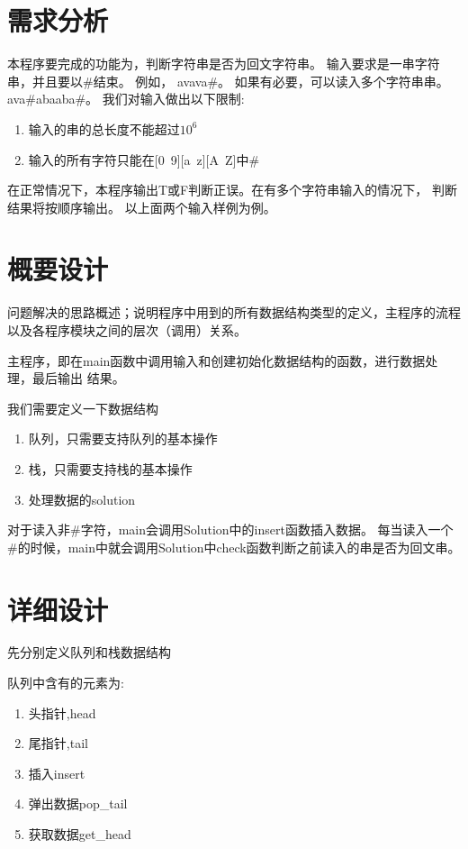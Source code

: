\section{需求分析}

本程序要完成的功能为，判断字符串是否为回文字符串。
输入要求是一串字符串，并且要以\#结束。
例如，
avava\#。
如果有必要，可以读入多个字符串串。
ava\#abaaba\#。
我们对输入做出以下限制:
\begin{enumerate}
   \item 输入的串的总长度不能超过$10^6$
   \item 输入的所有字符只能在[0~9][a~z][A~Z]中\#
\end{enumerate}


在正常情况下，本程序输出T或F判断正误。在有多个字符串输入的情况下，
判断结果将按顺序输出。
以上面两个输入样例为例。



\section{概要设计}
   问题解决的思路概述；说明程序中用到的所有数据结构类型的定义，主程序的流程以及各程序模块之间的层次（调用）关系。
   
   
   主程序，即在main函数中调用输入和创建初始化数据结构的函数，进行数据处理，最后输出
   结果。


   我们需要定义一下数据结构
   \begin{enumerate}
      \item 队列，只需要支持队列的基本操作
      \item 栈，只需要支持栈的基本操作
      \item 处理数据的solution
   \end{enumerate}


   对于读入非\#字符，main会调用Solution中的insert函数插入数据。
   每当读入一个\#的时候，main中就会调用Solution中check函数判断之前读入的串是否为回文串。

\section{详细设计}

   先分别定义队列和栈数据结构


   队列中含有的元素为:
   \begin{enumerate}
      \item 头指针,head
      \item 尾指针,tail
      \item 插入insert
      \item 弹出数据pop\_tail
      \item 获取数据get\_head
   \end{enumerate}



